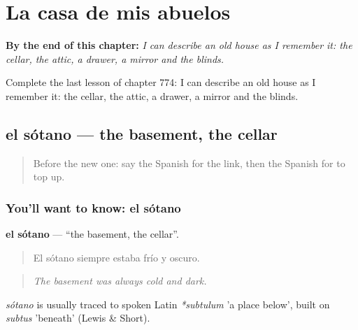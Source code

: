 
\chapter{La casa de mis abuelos}
\label{ch:es-la-casa-de-mis-abuelos}

\begin{chapteropening}
\textbf{By the end of this chapter:} \emph{I can describe an old house as I remember it: the cellar, the attic, a drawer, a mirror and the blinds.}

Complete the last lesson of chapter 774: I can describe an old house as I remember it: the cellar, the attic, a drawer, a mirror and the blinds.
\end{chapteropening}

\section[el sótano]{el sótano — the basement, the cellar}

\label{lesson:ES-C774-sotano}



\begin{quote}
Before the new one: say the Spanish for the link, then the Spanish for to top up.
\end{quote}

\subsection*{You'll want to know: el sótano}
\textbf{el sótano} — \textquotedblleft{}the basement, the cellar\textquotedblright{}.

\begin{quote}
El sótano siempre estaba frío y oscuro.
\end{quote}

\begin{quote}
\emph{The basement was always cold and dark.}
\end{quote}

\begin{cousinweb}
\emph{sótano} is usually traced to spoken Latin \emph{*subtulum} 'a place below', built on \emph{subtus} 'beneath' (Lewis \& Short).
\end{cousinweb}

